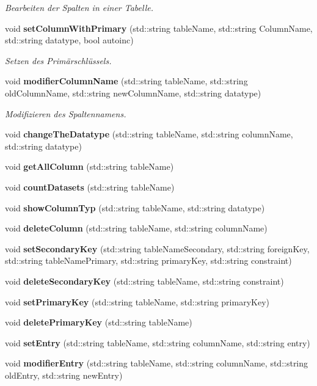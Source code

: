 \begin{DoxyCompactItemize}
\begin{DoxyCompactList}\small\item\em Bearbeiten der Spalten in einer Tabelle. \end{DoxyCompactList}\item 
void \textbf{ set\+Column\+With\+Primary} (std\+::string table\+Name, std\+::string Column\+Name, std\+::string datatype, bool autoinc)
\begin{DoxyCompactList}\small\item\em Setzen des Primärschlüssels. \end{DoxyCompactList}\item 
void \textbf{ modifier\+Column\+Name} (std\+::string table\+Name, std\+::string old\+Column\+Name, std\+::string new\+Column\+Name, std\+::string datatype)
\begin{DoxyCompactList}\small\item\em Modifizieren des Spaltennamens. \end{DoxyCompactList}\item 
void \textbf{ change\+The\+Datatype} (std\+::string table\+Name, std\+::string column\+Name, std\+::string datatype)
\item 
void \textbf{ get\+All\+Column} (std\+::string table\+Name)
\item 
void \textbf{ count\+Datasets} (std\+::string table\+Name)
\item 
void \textbf{ show\+Column\+Typ} (std\+::string table\+Name, std\+::string datatype)
\item 
void \textbf{ delete\+Column} (std\+::string table\+Name, std\+::string column\+Name)
\item 
void \textbf{ set\+Secondary\+Key} (std\+::string table\+Name\+Secondary, std\+::string foreign\+Key, std\+::string table\+Name\+Primary, std\+::string primary\+Key, std\+::string constraint)
\item 
void \textbf{ delete\+Secondary\+Key} (std\+::string table\+Name, std\+::string constraint)
\item 
void \textbf{ set\+Primary\+Key} (std\+::string table\+Name, std\+::string primary\+Key)
\item 
void \textbf{ delete\+Primary\+Key} (std\+::string table\+Name)
\item 
void \textbf{ set\+Entry} (std\+::string table\+Name, std\+::string column\+Name, std\+::string entry)
\item 
void \textbf{ modifier\+Entry} (std\+::string table\+Name, std\+::string column\+Name, std\+::string old\+Entry, std\+::string new\+Entry)

\end{DoxyCompactItemize}
